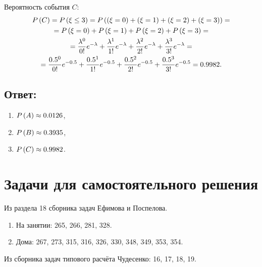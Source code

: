 Вероятность события $C$:
\begin{multline}
    P \left ( C \right )
    = P \left ( \xi \le 3 \right )
    = P \left ( \left ( \xi = 0 \right ) + \left ( \xi = 1 \right ) + \left ( \xi = 2 \right ) + \left ( \xi = 3 \right ) \right ) = \\
    = P \left ( \xi = 0 \right ) + P \left ( \xi = 1 \right ) + P \left ( \xi = 2 \right ) + P \left ( \xi = 3 \right ) = \\
    = \frac{\lambda^0}{0!} e^{-\lambda} + \frac{\lambda^1}{1!} e^{-\lambda} + \frac{\lambda^2}{2!} e^{-\lambda} + \frac{\lambda^3}{3!} e^{-\lambda} = \\
    = \frac{0.5^0}{0!} e^{-0.5} + \frac{0.5^1}{1!} e^{-0.5} + \frac{0.5^2}{2!} e^{-0.5} + \frac{0.5^3}{3!} e^{-0.5}
    = 0.9982 .
\end{multline}

\subsection*{Ответ:}
\begin{enumerate}
    \item $P \left ( A \right ) \approx 0.0126$,
    \item $P \left ( B \right ) \approx 0.3935$,
    \item $P \left ( C \right ) \approx 0.9982$.
\end{enumerate}

\section*{Задачи для самостоятельного решения}

Из раздела 18 сборника задач Ефимова и Поспелова.
\begin{enumerate}
    \item На занятии: 265, 266, 281, 328.
    \item Дома: 267, 273, 315, 316, 326, 330, 348, 349, 353, 354.
\end{enumerate}

Из сборника задач типового расчёта Чудесенко: 16, 17, 18, 19.